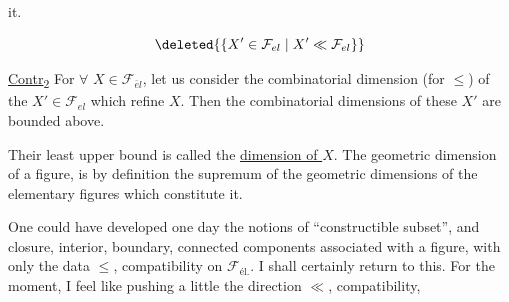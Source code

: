   it. 

\[
\deleted{\{X'\in \mathcal{F}_{el}\mid X'\ll \mathcal{F}_{el}\}}
\]

\uline{Contr}\textsubscript{2} For $\forall$ $X\in \mathcal{F}_{\bar e l}$, let us consider the combinatorial dimension (for $\leq$) of the $X'\in \mathcal{F}_{el}$  which refine $X$. Then the combinatorial dimensions of these $X'$ are bounded above.

Their least upper bound is called the \uline{ dimension of $X$}. The geometric dimension of a figure, is by definition the supremum of the geometric dimensions of the  elementary figures which constitute it.


One could have developed one day the notions of ``constructible subset'', and closure, interior, boundary, connected components associated with a figure, with only the data $\leq$, compatibility on   $\mathcal{F}_{\text{él.}}$.
I shall certainly return to this. For the moment, I feel like pushing  a little  the direction $\ll$, compatibility,
